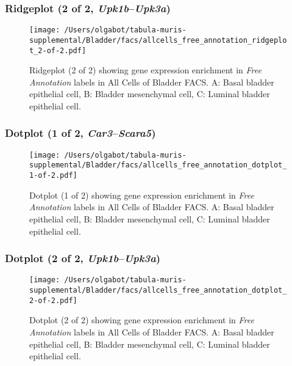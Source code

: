 \clearpage

\subsubsection{Ridgeplot (2 of 2, \emph{Upk1b}--\emph{Upk3a})}
\begin{figure}[h]
\centering
\texttt{[image: /Users/olgabot/tabula-muris-supplemental/Bladder/facs/allcells\_free\_annotation\_ridgeplot\_2-of-2.pdf]}

\caption{ Ridgeplot (2 of 2)  showing gene expression enrichment in \emph{Free Annotation} labels in All Cells of Bladder FACS. A: Basal bladder epithelial cell, B: Bladder mesenchymal cell, C: Luminal bladder epithelial cell.}
\end{figure}


\clearpage

\subsubsection{Dotplot (1 of 2, \emph{Car3}--\emph{Scara5})}
\begin{figure}[h]
\centering
\texttt{[image: /Users/olgabot/tabula-muris-supplemental/Bladder/facs/allcells\_free\_annotation\_dotplot\_1-of-2.pdf]}

\caption{ Dotplot (1 of 2)  showing gene expression enrichment in \emph{Free Annotation} labels in All Cells of Bladder FACS. A: Basal bladder epithelial cell, B: Bladder mesenchymal cell, C: Luminal bladder epithelial cell.}
\end{figure}


\clearpage

\subsubsection{Dotplot (2 of 2, \emph{Upk1b}--\emph{Upk3a})}
\begin{figure}[h]
\centering
\texttt{[image: /Users/olgabot/tabula-muris-supplemental/Bladder/facs/allcells\_free\_annotation\_dotplot\_2-of-2.pdf]}

\caption{ Dotplot (2 of 2)  showing gene expression enrichment in \emph{Free Annotation} labels in All Cells of Bladder FACS. A: Basal bladder epithelial cell, B: Bladder mesenchymal cell, C: Luminal bladder epithelial cell.}
\end{figure}


\clearpage

